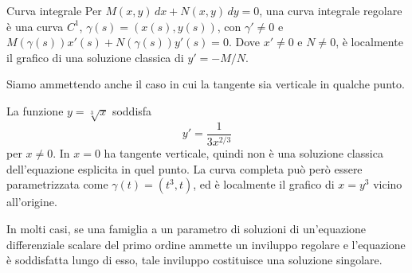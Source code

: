 \documentclass[a4paper]{article}
\begin{document}
\begin{radioactive}
\begin{snippetdefinition}{Curva integrale}
    Per \(M(x,y)\,dx+N(x,y)\,dy=0\), una curva integrale regolare è una
    curva \(C^1\), \(\gamma(s)=(x(s),y(s))\), con \(\gamma'\neq0\) e
    \(M(\gamma(s))x'(s)+N(\gamma(s))y'(s)=0\).
    Dove \(x'\neq0\) e \(N\neq0\), è localmente il grafico di una
    soluzione classica di \(y'=-M/N\).
\end{snippetdefinition}
\end{radioactive}

\begin{radioactive}
Siamo ammettendo anche il caso in cui la tangente sia verticale in qualche punto.
\end{radioactive}

\begin{radioactive}
\begin{snippetexample}{}
    La funzione \(y = \sqrt[3]{x}\) soddisfa
    \[
        y' = \frac{1}{3x^{2/3}}
    \]
    per \(x\neq0\). In \(x=0\) ha tangente verticale, quindi non è una soluzione classica
    dell'equazione esplicita in quel punto. La curva completa può però essere parametrizzata come
    \(\gamma(t)=(t^3,t)\), ed è localmente il grafico di \(x=y^3\) vicino all'origine.
\end{snippetexample}
\end{radioactive}

\begin{radioactive}
In molti casi, se una famiglia a un parametro di soluzioni di un'equazione differenziale scalare del primo ordine ammette un inviluppo regolare e l'equazione è soddisfatta lungo di esso, tale inviluppo costituisce una soluzione singolare.
\end{radioactive}
\end{document}
